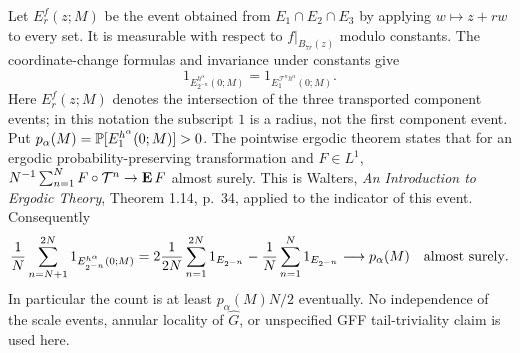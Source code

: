 \documentclass[12pt]{amsart}
\numberwithin{equation}{section}
\begin{document}
Let $E_r^f(z;M)$ be the event obtained from
$E_1\cap E_2\cap E_3$ by applying $w\mapsto z+rw$ to
every set. It is measurable with respect to
$f|_{B_{7r}(z)}$ modulo constants. The coordinate-change formulas
and invariance under constants give
\[
 1_{E_{2^{-n}}^{h^\alpha}(0;M)}
 =1_{E_1^{\,\mathcal T^n h^\alpha}(0;M)}.
\]
Here $E_r^f(z;M)$ denotes the intersection of the three transported component events; in this notation the subscript $1$ is a radius, not the first component event.
Put $p_\alpha(M)=\P[E_1^{h^\alpha}(0;M)]>0$.
The pointwise ergodic theorem states that for an ergodic
probability-preserving transformation and $F\in L^1$,
$N^{-1}\sum_{n=1}^N F\circ\mathcal T^n\to\E F$ almost surely.
This is Walters, \emph{An Introduction to Ergodic Theory},
Theorem 1.14, p.~34, applied to the indicator of this event.
Consequently
\begin{equation}\label{s11-pinch:eq:dyadic-frequency}
 \frac1N\sum_{n=N+1}^{2N}
 1_{E_{2^{-n}}^{h^\alpha}(0;M)}
 =2\frac1{2N}\sum_{n=1}^{2N}1_{E_{2^{-n}}}
       -\frac1N\sum_{n=1}^{N}1_{E_{2^{-n}}}
 \longrightarrow p_\alpha(M)\quad\hbox{almost surely}.
\end{equation}
In particular the count is at least $p_\alpha(M)N/2$
eventually. No independence of the scale events, annular
locality of $\widehat G$, or unspecified GFF tail-triviality
claim is used here.
\end{document}
